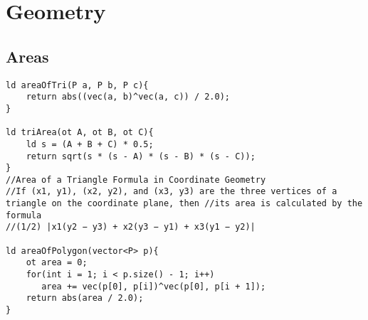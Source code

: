 \documentclass{article}
\begin{document}
\section{Geometry}

\subsection{Areas}
\begin{verbatim}
ld areaOfTri(P a, P b, P c){  
    return abs((vec(a, b)^vec(a, c)) / 2.0);  
}  

ld triArea(ot A, ot B, ot C){  
    ld s = (A + B + C) * 0.5;  
    return sqrt(s * (s - A) * (s - B) * (s - C));  
} 
//Area of a Triangle Formula in Coordinate Geometry  
//If (x1, y1), (x2, y2), and (x3, y3) are the three vertices of a triangle on the coordinate plane, then //its area is calculated by the formula  
//(1/2) |x1(y2 − y3) + x2(y3 − y1) + x3(y1 − y2)|  

ld areaOfPolygon(vector<P> p){  
    ot area = 0;  
    for(int i = 1; i < p.size() - 1; i++)  
       area += vec(p[0], p[i])^vec(p[0], p[i + 1]);  
    return abs(area / 2.0);  
}
\end{verbatim}
\end{document}
